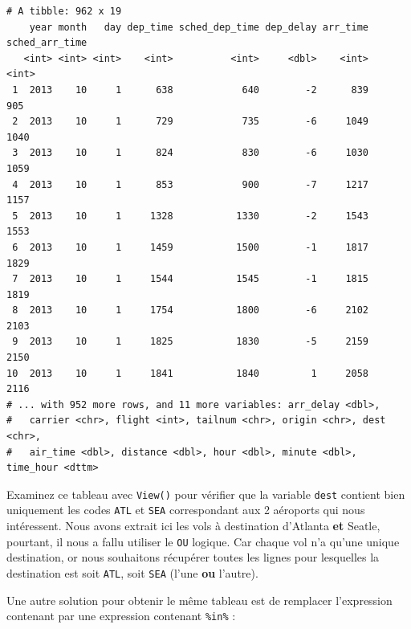 \documentclass[a4paperpaper,]{article}
\newenvironment{Shaded}{\begin{snugshade}}{\end{snugshade}}
\newcommand{\KeywordTok}[1]{\textcolor[rgb]{0.13,0.29,0.53}{\textbf{#1}}}
\newcommand{\DecValTok}[1]{\textcolor[rgb]{0.00,0.00,0.81}{#1}}
\newcommand{\StringTok}[1]{\textcolor[rgb]{0.31,0.60,0.02}{#1}}
\newcommand{\OperatorTok}[1]{\textcolor[rgb]{0.81,0.36,0.00}{\textbf{#1}}}
\newcommand{\NormalTok}[1]{#1}
\theoremstyle{definition}
\theoremstyle{definition}
\theoremstyle{definition}
\theoremstyle{remark}
\begin{document}
\begin{verbatim}
# A tibble: 962 x 19
    year month   day dep_time sched_dep_time dep_delay arr_time sched_arr_time
   <int> <int> <int>    <int>          <int>     <dbl>    <int>          <int>
 1  2013    10     1      638            640        -2      839            905
 2  2013    10     1      729            735        -6     1049           1040
 3  2013    10     1      824            830        -6     1030           1059
 4  2013    10     1      853            900        -7     1217           1157
 5  2013    10     1     1328           1330        -2     1543           1553
 6  2013    10     1     1459           1500        -1     1817           1829
 7  2013    10     1     1544           1545        -1     1815           1819
 8  2013    10     1     1754           1800        -6     2102           2103
 9  2013    10     1     1825           1830        -5     2159           2150
10  2013    10     1     1841           1840         1     2058           2116
# ... with 952 more rows, and 11 more variables: arr_delay <dbl>,
#   carrier <chr>, flight <int>, tailnum <chr>, origin <chr>, dest <chr>,
#   air_time <dbl>, distance <dbl>, hour <dbl>, minute <dbl>, time_hour <dttm>
\end{verbatim}

Examinez ce tableau avec \texttt{View()} pour vérifier que la variable
\texttt{dest} contient bien uniquement les codes \texttt{ATL} et
\texttt{SEA} correspondant aux 2 aéroports qui nous intéressent. Nous
avons extrait ici les vols à destination d'Atlanta \textbf{et} Seatle,
pourtant, il nous a fallu utiliser le \texttt{OU} logique. Car chaque
vol n'a qu'une unique destination, or nous souhaitons récupérer toutes
les lignes pour lesquelles la destination est soit \texttt{ATL}, soit
\texttt{SEA} (l'une \textbf{ou} l'autre).

Une autre solution pour obtenir le même tableau est de remplacer
l'expression contenant \texttt{\textbar{}} par une expression contenant
\texttt{\%in\%} :

\begin{Shaded}
\end{Shaded}
\end{document}
